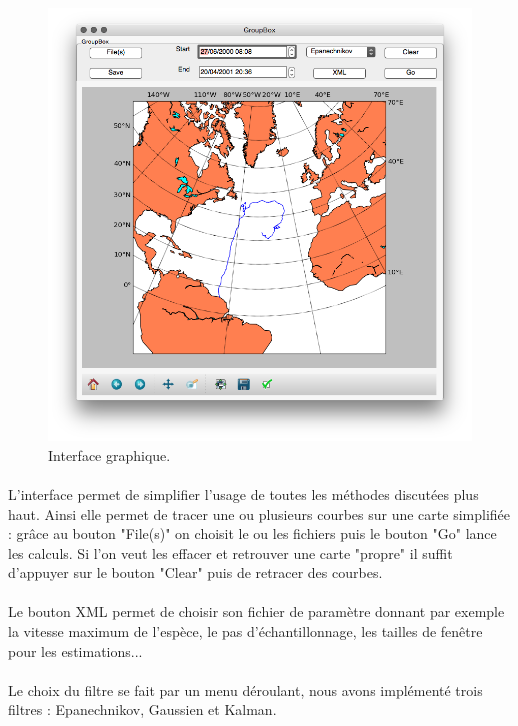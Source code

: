 \documentclass[11p, a4papert]{article}
\begin{document}
\begin{figure}[h!]
\centering
\includegraphics[scale=0.5]{gui.png}
\caption{Interface graphique.}
\end{figure}


\paragraph{}
L'interface permet de simplifier l'usage de toutes les méthodes discutées plus haut. Ainsi elle permet de tracer une ou plusieurs courbes sur une carte simplifiée : grâce au bouton "File(s)" on choisit le ou les fichiers puis le bouton "Go" lance les calculs. Si l'on veut les effacer et retrouver une carte "propre" il suffit d'appuyer sur le bouton "Clear" puis de retracer des courbes. 

\paragraph{}
Le bouton XML permet de choisir son fichier de paramètre donnant par exemple la vitesse maximum de l'espèce, le pas d'échantillonnage, les tailles de fenêtre pour les estimations...

\paragraph{}
Le choix du filtre se fait par un menu déroulant, nous avons implémenté trois filtres : Epanechnikov, Gaussien et Kalman.
\end{document}

